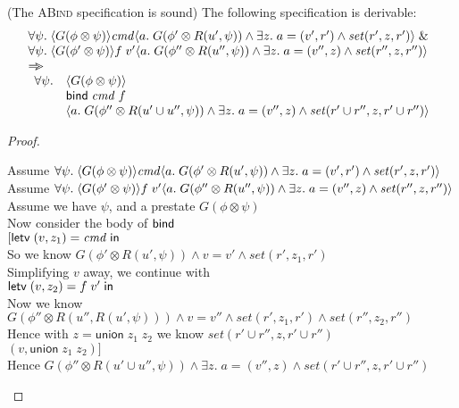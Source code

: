 \begin{prop*}{(The \textsc{ABind} specification is sound)}
The following specification is derivable:
\begin{displaymath}
\begin{array}{l}
\forall \psi.\; \langle{G(\phi \otimes \psi)}\rangle{\mathit{cmd}}\langle{a}.\;{G(\phi' \otimes R(u', \psi)) \land \exists z.\;a = (v', r') \land \mathit{set}(r', z, r')}\rangle 
                \;\&\; \\
\forall \psi.\; \langle{G(\phi' \otimes \psi)}\rangle{f\;v'}\langle{a}.\;{G(\phi'' \otimes R(u'', \psi)) \land \exists z.\; a = (v'', z) \land \mathit{set}(r'', z, r'')}\rangle\\
\Rightarrow\!\!\!> \\
\begin{array}{ll}
     \forall \psi. & \left<G(\phi \otimes \psi)\right> \\
                   & \mathsf{bind}\; \mathit{cmd}\;f \\
                   &  \left<a.\;G(\phi'' \otimes R(u' \cup u'', \psi)) \land \exists z.\;a = (v'', z) \land \mathit{set}(r' \cup r'', z, r' \cup r'')\right> \\
   \end{array}
\end{array}
\end{displaymath}
\end{prop*}

\begin{proof}
\begin{tabbedproof}
\oo Assume $\forall \psi.\; \langle{G(\phi \otimes \psi)}\rangle{\mathit{cmd}}\langle{a}.\;{G(\phi' \otimes R(u', \psi)) \land \exists z.\;a = (v', r') \land \mathit{set}(r', z, r')}\rangle$ \\
\oo Assume $\forall \psi.\; \langle{G(\phi' \otimes \psi)}\rangle{f\;v'}\langle{a}.\;{G(\phi'' \otimes R(u'', \psi)) \land \exists z.\; a = (v'', z) \land \mathit{set}(r'', z, r'')}\rangle$ \\
\oo Assume we have $\psi$, and a prestate $G(\phi \otimes \psi)$ \\
\ooo Now consider the body of $\mathsf{bind}\;$ \\
\ooo $[\mathsf{letv}\;(v, z_1) = \mathit{cmd}\;\mathsf{in}\;$ \\
\ooo So we know $G(\phi' \otimes R(u', \psi)) \land v = v' \land \mathit{set}(r', z_1, r')$ \\
\ooo Simplifying $v$ away, we continue with \\
\ooo $\mathsf{letv}\;(v, z_2) = f\;v'\;\mathsf{in}\;$ \\
\ooo Now we know $G(\phi'' \otimes R(u'', R(u', \psi))) \land v = v'' \land \mathit{set}(r', z_1, r') \land \mathit{set}(r'', z_2, r'')$ \\
\ooo Hence with $z = \mathsf{union}\;z_1\;z_2$ we know $\mathit{set}(r' \cup r'', z, r' \cup r'')$ \\
\ooo $(v, \mathsf{union}\;z_1\;z_2)]$ \\
\ooo Hence $G(\phi'' \otimes R(u' \cup u'', \psi)) \land \exists z.\; a = (v'', z) \land \mathit{set}(r' \cup r'', z, r' \cup r'')$ 
\end{tabbedproof}
\end{proof}

